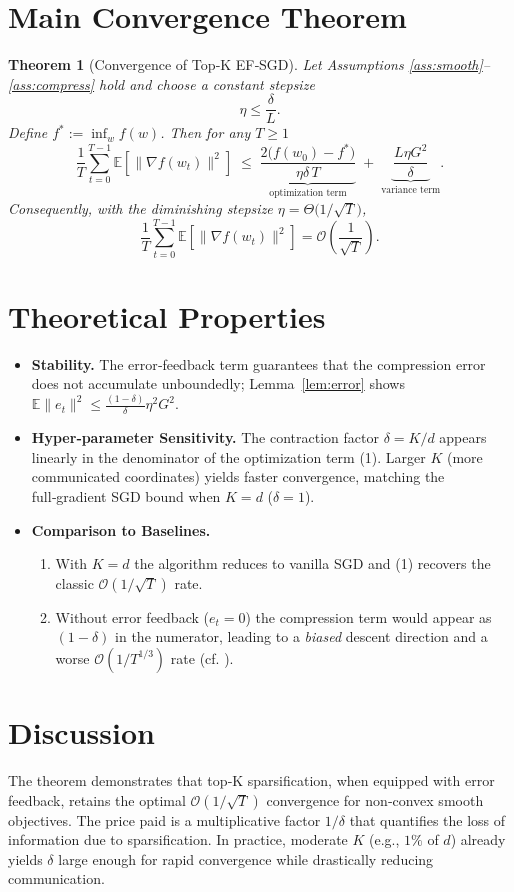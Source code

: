 \documentclass{article}
\newtheorem{theorem}{Theorem}
\begin{document}
\section*{Main Convergence Theorem}
\begin{theorem}[Convergence of Top‑K EF‑SGD]\label{thm:main}
Let Assumptions \ref{ass:smooth}–\ref{ass:compress} hold and choose a constant stepsize 
\[
\eta\le\frac{\delta}{L}.
\]
Define $f^{*}:=\inf_{w}f(w)$. Then for any $T\ge1$
\[
\frac{1}{T}\sum_{t=0}^{T-1}\mathbb{E}\!\left[\|\nabla f(w_{t})\|^{2}\right]
\;\le\;
\underbrace{\frac{2\bigl(f(w_{0})-f^{*}\bigr)}{\eta\delta\,T}}_{\text{optimization term}}
\;+\;
\underbrace{\frac{L\eta G^{2}}{\delta}}_{\text{variance term}}.
\tag{1}
\]
Consequently, with the diminishing stepsize $\eta=\Theta\!\bigl(1/\sqrt{T}\bigr)$,
\[
\frac{1}{T}\sum_{t=0}^{T-1}\mathbb{E}\!\left[\|\nabla f(w_{t})\|^{2}\right]=\mathcal{O}\!\left(\frac{1}{\sqrt{T}}\right).
\]
\end{theorem}

\section*{Theoretical Properties}
\begin{itemize}
\item \textbf{Stability.} The error‑feedback term guarantees that the compression error does not accumulate unboundedly; Lemma~\ref{lem:error} shows $\mathbb{E}\|e_{t}\|^{2}\le\frac{(1-\delta)}{\delta}\eta^{2}G^{2}$.
\item \textbf{Hyper‑parameter Sensitivity.} The contraction factor $\delta=K/d$ appears linearly in the denominator of the optimization term (1). Larger $K$ (more communicated coordinates) yields faster convergence, matching the full‑gradient SGD bound when $K=d$ ($\delta=1$).
\item \textbf{Comparison to Baselines.}
    \begin{enumerate}
        \item With $K=d$ the algorithm reduces to vanilla SGD and (1) recovers the classic $\mathcal{O}(1/\sqrt{T})$ rate.
        \item Without error feedback ($e_{t}=0$) the compression term would appear as $(1-\delta)$ in the numerator, leading to a \emph{biased} descent direction and a worse $\mathcal{O}(1/T^{1/3})$ rate (cf. \cite{alistarh2018qsgd}).  
    \end{enumerate}
\end{itemize}

\section*{Discussion}
The theorem demonstrates that top‑K sparsification, when equipped with error feedback, retains the optimal $\mathcal{O}(1/\sqrt{T})$ convergence for non‑convex smooth objectives. The price paid is a multiplicative factor $1/\delta$ that quantifies the loss of information due to sparsification. In practice, moderate $K$ (e.g., $1\%$ of $d$) already yields $\delta$ large enough for rapid convergence while drastically reducing communication.
\end{document}
